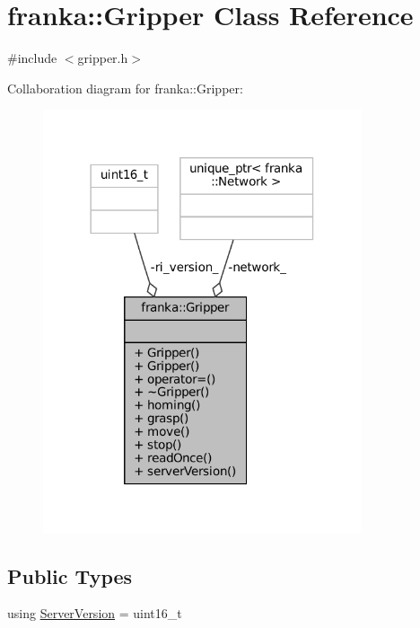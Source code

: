 \hypertarget{classfranka_1_1Gripper}{}\section{franka\+:\+:Gripper Class Reference}
\label{classfranka_1_1Gripper}


{\ttfamily \#include $<$gripper.\+h$>$}



Collaboration diagram for franka\+:\+:Gripper\+:
\nopagebreak
\begin{figure}[H]
\begin{center}
\leavevmode
\includegraphics[width=266pt]{classfranka_1_1Gripper__coll__graph}
\end{center}
\end{figure}
\subsection*{Public Types}
\begin{DoxyCompactItemize}
\item 
using \hyperlink{classfranka_1_1Gripper_a613bf52d9433b733685d0fb9ea71602e}{Server\+Version} = uint16\+\_\+t
\end{DoxyCompactItemize}
